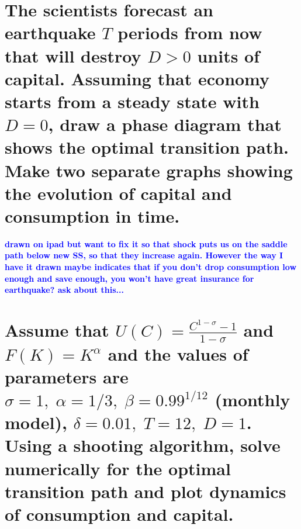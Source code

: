\documentclass[]{article}
\newcommand{\fix} [1] {\textbf{\textcolor{blue}{#1}}} %
\begin{document}
\section{The  scientists  forecast  an  earthquake $T$ periods  from  now  that  will  destroy $D >0$ units of capital.  Assuming that economy starts from a steady state with $D= 0$, draw a phase diagram that shows the optimal transition path.  Make two separate graphs showing the evolution of capital and consumption in time.}
\fix{drawn on ipad but want to fix it so that shock puts us on the saddle path below new SS, so that they increase again. However the way I have it drawn maybe indicates that if you don't drop consumption low enough and save enough, you won't have great insurance for earthquake? ask about this...}

\section{Assume that $U(C) = \frac{C^{1-\sigma}-1}{1-\sigma} $ and $F(K)= K^\alpha$ and the values of parameters are $\sigma= 1,\;\alpha= 1/3,\;\beta= 0.99^{1/12}$ (monthly model), $\delta = 0.01,\; T= 12,\;D= 1$.  Using a shooting algorithm,  solve  numerically  for  the  optimal  transition  path  and  plot  dynamics  of consumption and capital.}
\end{document}
